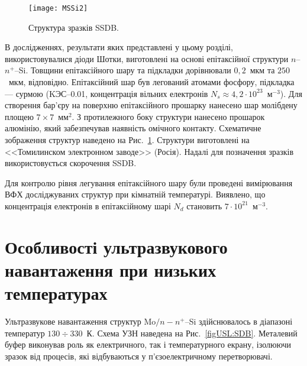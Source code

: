\documentclass[a4paper,14pt,oneside,openany]{memoir}
\begin{document}
\begin{figure}[b]
\center
\texttt{[image: MSSi2]}%
\caption{\label{figMSSi2}
Структура зразків SSDB.
}
\end{figure}


В дослідженнях, результати яких представлені у цьому розділі, використовувалися діоди Шотки, виготовлені на основі епітаксійної
структури $n$--$n^+$--Si.
Товщини епітаксійного шару та підкладки дорівнювали $0,2$~мкм та $250$~мкм, відповідно.
Епітаксійний шар був легований атомами фосфору, підкладка --- сурмою
(KЭС--0.01, концентрація вільних електронів $N_s\approx4,2\cdot10^{23}$~м$^{-3}$).
Для створення бар'єру на поверхню епітаксійного прошарку нанесено шар молібдену площею $7\times7$~мм$^2$.
З протилежного боку структури нанесено прошарок алюмінію, який забезпечував наявність омічного контакту.
Схематичне зображення структур наведено на Рис.~\ref{figMSSi2}.
Структури виготовлені на <<Томилинском электронном заводе>>  (Росія).
Надалі для позначення зразків використовується скорочення SSDB.

Для контролю рівня легування епітаксійного шару були проведені
вимірювання ВФХ досліджуваних структур при кімнатній температурі.
Виявлено, що концентрація електронів в епітаксійному шарі $N_d$ становить $7\cdot10^{21}$~м$^{-3}$.



\section{Особливості ультразвукового навантаження при низьких температурах\label{SSDB:USL}}

Ультразвукове навантаження структур Mo$/n-n^+$--Si здійснювалось в діапазоні температур $130\div330$~К.
Схема УЗН наведена на Рис.~\ref{figUSL:SDB}.
Металевий буфер виконував роль як електричного, так і температурного екрану, ізолюючи зразок від процесів, які відбуваються у
п'єзоелектричному перетворювачі.
\end{document}
